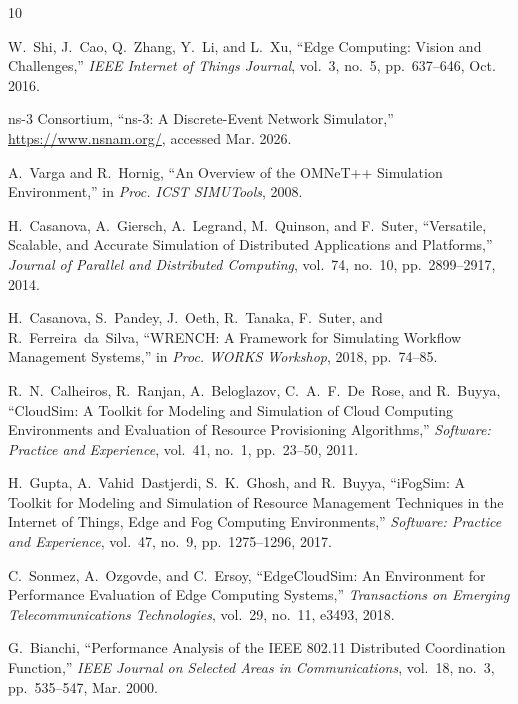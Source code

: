 \documentclass[conference]{IEEEtran}
\begin{document}

\begin{thebibliography}{10}

W.~Shi, J.~Cao, Q.~Zhang, Y.~Li, and L.~Xu,
``Edge Computing: Vision and Challenges,''
\emph{IEEE Internet of Things Journal},
vol.~3, no.~5, pp.~637--646, Oct. 2016.

{ns-3 Consortium},
``ns-3: A Discrete-Event Network Simulator,''
\url{https://www.nsnam.org/}, accessed Mar. 2026.

A.~Varga and R.~Hornig,
``An Overview of the OMNeT++ Simulation Environment,''
in \emph{Proc. ICST SIMUTools}, 2008.

H.~Casanova, A.~Giersch, A.~Legrand, M.~Quinson, and F.~Suter,
``Versatile, Scalable, and Accurate Simulation of Distributed Applications
and Platforms,''
\emph{Journal of Parallel and Distributed Computing},
vol.~74, no.~10, pp.~2899--2917, 2014.

H.~Casanova, S.~Pandey, J.~Oeth, R.~Tanaka, F.~Suter, and R.~Ferreira~da~Silva,
``WRENCH: A Framework for Simulating Workflow Management Systems,''
in \emph{Proc. WORKS Workshop}, 2018, pp.~74--85.

R.~N.~Calheiros, R.~Ranjan, A.~Beloglazov, C.~A.~F.~De~Rose, and R.~Buyya,
``CloudSim: A Toolkit for Modeling and Simulation of Cloud Computing
Environments and Evaluation of Resource Provisioning Algorithms,''
\emph{Software: Practice and Experience},
vol.~41, no.~1, pp.~23--50, 2011.

H.~Gupta, A.~Vahid~Dastjerdi, S.~K.~Ghosh, and R.~Buyya,
``iFogSim: A Toolkit for Modeling and Simulation of Resource Management
Techniques in the Internet of Things, Edge and Fog Computing Environments,''
\emph{Software: Practice and Experience},
vol.~47, no.~9, pp.~1275--1296, 2017.

C.~Sonmez, A.~Ozgovde, and C.~Ersoy,
``EdgeCloudSim: An Environment for Performance Evaluation of Edge Computing
Systems,''
\emph{Transactions on Emerging Telecommunications Technologies},
vol.~29, no.~11, e3493, 2018.

G.~Bianchi,
``Performance Analysis of the IEEE 802.11 Distributed Coordination Function,''
\emph{IEEE Journal on Selected Areas in Communications},
vol.~18, no.~3, pp.~535--547, Mar. 2000.

\end{thebibliography}
\end{document}
